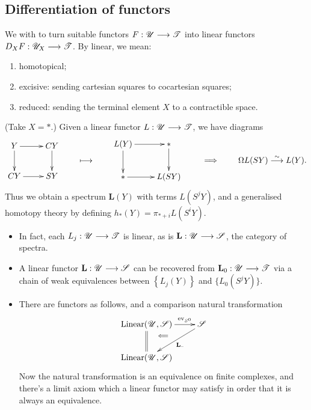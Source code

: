 \documentclass[11pt]{article}
\begin{document}
\begin{Calculus I}
\subsection*{Differentiation of functors}
\begin{itemise}
\setlength{\parindent}{.25in}
\item We with to turn suitable functors $F:\mathscr{U}\longrightarrow\mathscr{T}$ into linear functors $D_XF:\mathscr{U}_X\longrightarrow\mathscr{T}$. By linear, we mean:
\begin{enumerate}\squishlist
\setlength{\parindent}{.25in}
\item homotopical;
\item excisive: sending cartesian squares to cocartesian squares;
\item reduced: sending the terminal element $X$ to a contractible space.
\end{enumerate}
\item (Take $X=*$.) Given a linear functor $L:\mathscr{U}\longrightarrow\mathscr{T}$, we have diagrams
\[\vcenter{\xymatrix{
Y
\ar[r]
\ar[d]
&%
CY
\ar[d]
\\%
CY
\ar[r]
&%
SY%
}}\qquad \mapsto\qquad 
\vcenter{\xymatrix{
L(Y)
\ar[r]
\ar[d]
&%
\ast
\ar[d]
\\%
\ast
\ar[r]
&%
L(SY)%
}}\qquad \implies \qquad \Omega L(SY)\overset{\sim}{\to}L(Y).
\]
Thus we obtain a spectrum $\textbf{L}(Y)$ with terms $L(S^jY)$, and a generalised homotopy theory by defining $h_*(Y)=\pi_{*+i}L(S^iY)$.
\begin{itemize}\squishlist
\item In fact, each $L_j:\mathscr{U}\longrightarrow\mathscr{T}$ is linear, as is $\textbf{L}:\mathscr{U}\longrightarrow\mathscr{S}$, the category of spectra.
\setlength{\parindent}{.25in}
\item A linear functor $\textbf{L}:\mathscr{U}\longrightarrow\mathscr{S}$ can be recovered from $\textbf{L}_0:\mathscr{U}\longrightarrow\mathscr{T}$ via a chain of weak equivalences between $\left\{L_j(Y)\right\}$ and $\{L_0(S^jY)\}$.
\item There are functors as follows, and a comparison natural transformation
\[\xymatrix{
\textup{Linear}(\scru,\scrs)
\ar[r]^-{\textup{ev}_{S^0}}
\ar@{=}[d]^{}="mideq"
&%
\scrs
\ar[dl]^-{\textbf{L}_\DASH }
\\%
\textup{Linear}(\scru,\scrs)
&%
\ar@{}[u];"mideq"|(.7){\Longleftarrow}
}\]
Now the natural transformation is an equivalence on finite complexes, and there's a limit axiom which a linear functor may satisfy in order that it is always an equivalence.


\end{itemize}
\end{itemise}
\end{Calculus I}
\end{document}

